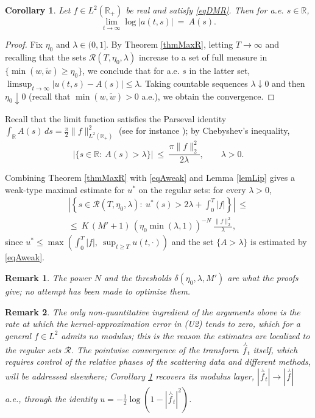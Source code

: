 \documentclass[11pt,twoside,reqno]{amsart}
\def\ti{\tilde}
\def\to{\rightarrow}
\def \nlhat {\overset{\ \curlywedge}}
\def\R{{\mathbb R}}
\def\RR{{\mathcal{R}}}
\def\d{\delta}
\theoremstyle{plain}
\newtheorem{corollary}{Corollary}
\newtheorem{remark}{Remark}
\numberwithin{equation}{section}
\begin{document}
\begin{corollary}\label{corConv}
Let $f\in L^2(\R_+)$ be real and satisfy \eqref{eqDMR}. Then for a.e. $s\in\R$,
$$\lim_{t\to\infty}\log|a(t,s)|\ =\ A(s) .$$
\end{corollary}

\begin{proof}
Fix $\eta_0$ and $\lambda\in(0,1]$. By Theorem \ref{thmMaxR}, letting $T\to\infty$ and recalling that the sets $\RR(T,\eta_0,\lambda)$ increase to a set of full measure in $\{\min(w,\ti w)\geq\eta_0\}$, we conclude that for a.e. $s$ in the latter set, $\limsup_{t\to\infty}|u(t,s)-A(s)|\leq\lambda$. Taking countable sequences $\lambda\downarrow0$ and then $\eta_0\downarrow0$ (recall that $\min(w,\ti w)>0$ a.e.), we obtain the convergence.
\end{proof}

Recall that the limit function satisfies the Parseval identity $\int_\R A(s)\,ds=\frac\pi2\|f\|^2_{L^2(\R_+)}$ (see for instance \cite{Den}); by Chebyshev's inequality,
\begin{equation}
|\{s\in\R:\ A(s)>\lambda\}|\ \leq\ \frac{\pi\|f\|_2^2}{2\lambda},\qquad\lambda>0.
\label{eqAweak}
\end{equation}

Combining Theorem \ref{thmMaxR} with \eqref{eqAweak} and Lemma \ref{lemLip} gives a weak-type maximal estimate for $u^*$ on the regular sets: for every $\lambda>0$,
\begin{equation}
\begin{gathered}
\left|\left\{s\in\RR(T,\eta_0,\lambda):\ u^*(s)>2\lambda+\int_0^T|f|\right\}\right|\ \leq\\
\leq\ K\,(M'+1)\,\left(\eta_0\min(\lambda,1)\right)^{-N}\ \frac{\|f\|^2_{2}}{\lambda},
\end{gathered}
\label{eqMaxRstar}
\end{equation}
since $u^*\leq\max\left(\int_0^T|f|,\ \sup_{t\geq T}u(t,\cdot)\right)$ and the set $\{A>\lambda\}$ is estimated by \eqref{eqAweak}.

\begin{remark}
The power $N$ and the thresholds $\d(\eta_0,\lambda,M')$ are what the proofs give; no attempt has been made to optimize them.
\end{remark}

\begin{remark}\label{remExtract}
The only non-quantitative ingredient of the arguments above is the rate at which the kernel-approximation error in (U2) tends to zero, which for a general $f\in L^2$ admits no modulus; this is the reason the estimates are localized to the regular sets $\RR$. The pointwise convergence of the transform $\nlhat f_t$ itself, which requires control of the relative phases of the scattering data and different methods, will be addressed elsewhere; Corollary \ref{corConv} recovers its modulus layer, $|\nlhat f_t|\to|\nlhat f|$ a.e., through the identity $u=-\frac12\log(1-|\nlhat f_t|^2)$.
\end{remark}
\end{document}

